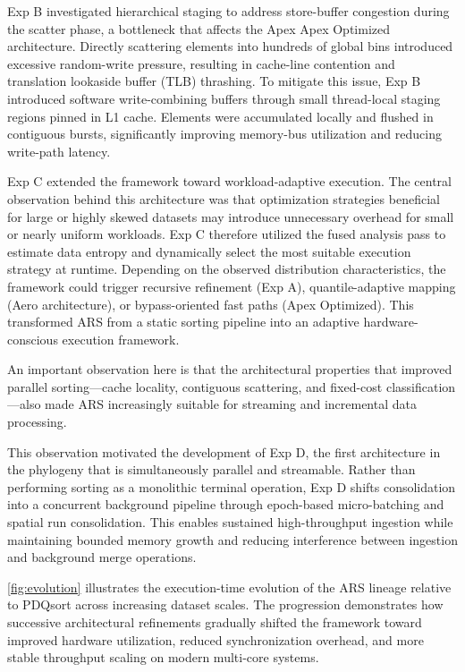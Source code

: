 Exp B investigated hierarchical staging to address store-buffer congestion during the scatter phase, a bottleneck that affects the Apex Apex Optimized architecture.
Directly scattering elements into hundreds of global bins introduced excessive random-write pressure, resulting in cache-line contention and translation lookaside buffer (TLB) thrashing.
To mitigate this issue, Exp B introduced software write-combining buffers through small thread-local staging regions pinned in L1 cache.
Elements were accumulated locally and flushed in contiguous bursts, significantly improving memory-bus utilization and reducing write-path latency.

Exp C extended the framework toward workload-adaptive execution.
The central observation behind this architecture was that optimization strategies beneficial for large or highly skewed datasets may introduce unnecessary overhead for small or nearly uniform workloads.
Exp C therefore utilized the fused analysis pass to estimate data entropy and dynamically select the most suitable execution strategy at runtime.
Depending on the observed distribution characteristics, the framework could trigger recursive refinement (Exp A), quantile-adaptive mapping (Aero architecture), or bypass-oriented fast paths (Apex Optimized).
This transformed ARS from a static sorting pipeline into an adaptive hardware-conscious execution framework.

An important observation here is that the architectural properties that improved parallel sorting---cache locality, contiguous scattering, and fixed-cost classification---also made ARS increasingly suitable for streaming and incremental data processing.

This observation motivated the development of Exp D, the first architecture in the phylogeny that is simultaneously parallel and streamable.
Rather than performing sorting as a monolithic terminal operation, Exp D shifts consolidation into a concurrent background pipeline through epoch-based micro-batching and spatial run consolidation. 
This enables sustained high-throughput ingestion while maintaining bounded memory growth and reducing interference between ingestion and background merge operations.

\cref{fig:evolution} illustrates the execution-time evolution of the ARS lineage relative to PDQsort across increasing dataset scales. 
The progression demonstrates how successive architectural refinements gradually shifted the framework toward improved hardware utilization, reduced synchronization overhead, and more stable throughput scaling on modern multi-core systems.

